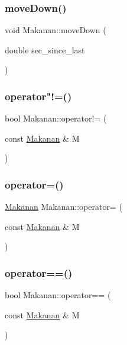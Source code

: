 \subsubsection{\texorpdfstring{move\+Down()}{moveDown()}}
{\footnotesize\ttfamily void Makanan\+::move\+Down (\begin{DoxyParamCaption}\item[{double}]{sec\+\_\+since\+\_\+last }\end{DoxyParamCaption})}

\mbox{\label{class_makanan_a832120fa6c5e08529fb3237d257b0d4d}} 
\subsubsection{\texorpdfstring{operator"!=()}{operator!=()}}
{\footnotesize\ttfamily bool Makanan\+::operator!= (\begin{DoxyParamCaption}\item[{const \mbox{\hyperlink{class_makanan}{Makanan}} \&}]{M }\end{DoxyParamCaption})}

\mbox{\label{class_makanan_a89a9fa8ab9dc136405f698128d70a7ad}} 
\subsubsection{\texorpdfstring{operator=()}{operator=()}}
{\footnotesize\ttfamily \mbox{\hyperlink{class_makanan}{Makanan}} Makanan\+::operator= (\begin{DoxyParamCaption}\item[{const \mbox{\hyperlink{class_makanan}{Makanan}} \&}]{M }\end{DoxyParamCaption})}

\mbox{\label{class_makanan_aeee966e624eda92eb398f8236a6b914d}} 
\subsubsection{\texorpdfstring{operator==()}{operator==()}\hspace{0.1cm}{\footnotesize\ttfamily [1/2]}}
{\footnotesize\ttfamily bool Makanan\+::operator== (\begin{DoxyParamCaption}\item[{const \mbox{\hyperlink{class_makanan}{Makanan}} \&}]{M }\end{DoxyParamCaption})}

